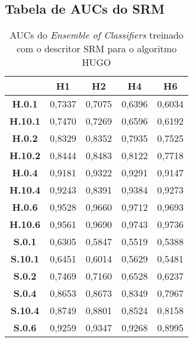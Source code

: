 
\begin{apendicesenv}
\partapendices

\chapter{Tabela de AUCs do SRM} %
\label{chap:apendiceA}

\begin{table}[!ht]
\centering
\caption{AUCs do \textit{Ensemble of Classifiers} treinado com o descritor SRM para o algoritmo HUGO}
\label{tab:auc_hugo}
\begin{tabular}{|c|c|c|c|c|}
\hline
                & \textbf{H1} & \textbf{H2} & \textbf{H4} & \textbf{H6} \\ \hline
\textbf{H.0.1}  & 0,7337      & 0,7075      & 0,6396      & 0,6034      \\ \hline
\textbf{H.10.1} & 0,7470      & 0,7269      & 0,6596      & 0,6192      \\ \hline
\textbf{H.0.2}  & 0,8329      & 0,8352      & 0,7935      & 0,7525      \\ \hline
\textbf{H.10.2} & 0,8444      & 0,8483      & 0,8122      & 0,7718      \\ \hline
\textbf{H.0.4}  & 0,9181      & 0,9322      & 0,9291      & 0,9147      \\ \hline
\textbf{H.10.4} & 0,9243      & 0,8391      & 0,9384      & 0,9273      \\ \hline
\textbf{H.0.6}  & 0,9528      & 0,9660      & 0,9712      & 0,9693      \\ \hline
\textbf{H.10.6} & 0,9561      & 0,9690      & 0,9743      & 0,9736      \\ \hline
\textbf{S.0.1}  & 0,6305      & 0,5847      & 0,5519      & 0,5388      \\ \hline
\textbf{S.10.1} & 0,6451      & 0,6014      & 0,5629      & 0,5481      \\ \hline
\textbf{S.0.2}  & 0,7469      & 0,7160      & 0,6528      & 0,6237      \\ \hline
\textbf{S.0.4}  & 0,8653      & 0,8673      & 0,8349      & 0,7967      \\ \hline
\textbf{S.10.4} & 0,8749      & 0,8801      & 0,8524      & 0,8158      \\ \hline
\textbf{S.0.6}  & 0,9259      & 0,9347      & 0,9268      & 0,8995      \\ \hline

\end{tabular}
\end{table}
\end{apendicesenv}
